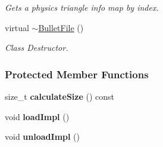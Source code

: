 \begin{DoxyCompactItemize}
\begin{DoxyCompactList}\small\item\em Gets a physics triangle info map by index. \item\end{DoxyCompactList}\item 
\hypertarget{classMezzanine_1_1internal_1_1BulletFile_a421e96fa997cf967859f3f44f268638e}{
virtual \hyperlink{classMezzanine_1_1internal_1_1BulletFile_a421e96fa997cf967859f3f44f268638e}{$\sim$BulletFile} ()}
\label{classMezzanine_1_1internal_1_1BulletFile_a421e96fa997cf967859f3f44f268638e}

\begin{DoxyCompactList}\small\item\em Class Destructor. \item\end{DoxyCompactList}\end{DoxyCompactItemize}
\subsubsection*{Protected Member Functions}
\begin{DoxyCompactItemize}
\item 
\hypertarget{classMezzanine_1_1internal_1_1BulletFile_a2068f2fa6d6b1e83a192708614766a17}{
size\_\-t {\bfseries calculateSize} () const }
\label{classMezzanine_1_1internal_1_1BulletFile_a2068f2fa6d6b1e83a192708614766a17}

\item 
\hypertarget{classMezzanine_1_1internal_1_1BulletFile_aba5bff7301a8acdc43c193b218000b09}{
void {\bfseries loadImpl} ()}
\label{classMezzanine_1_1internal_1_1BulletFile_aba5bff7301a8acdc43c193b218000b09}

\item 
\hypertarget{classMezzanine_1_1internal_1_1BulletFile_a1e0dc5cc56b6337c01ee7317935998ee}{
void {\bfseries unloadImpl} ()}
\label{classMezzanine_1_1internal_1_1BulletFile_a1e0dc5cc56b6337c01ee7317935998ee}

\end{DoxyCompactItemize}
